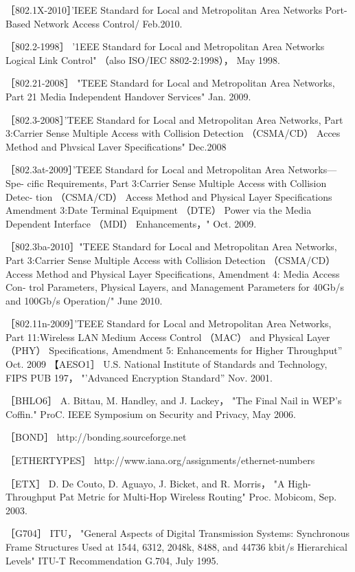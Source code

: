 ［802.1X-2010］'IEEE Standard for Local and Metropolitan Area Networks Port-
Based Network Access Control/ Feb.2010.

［802.2-1998］ '1EEE Standard for Local and Metropolitan Area Networks Logical
Link Control" （also ISO/IEC 8802-2:1998）， May 1998.

［802.21-2008］ "TEEE Standard for Local and Metropolitan Area Networks, Part 21
Media Independent Handover Services" Jan. 2009.

［802.3-2008］'TEEE Standard for Local and Metropolitan Area Networks, Part
3:Carrier Sense Multiple Access with Collision Detection （CSMA/CD） Acces
Method and Phvsical Laver Specifications" Dec.2008

［802.3at-2009］'TEEE Standard for Local and Metropolitan Area Networks—Spe-
cific Requirements, Part 3:Carrier Sense Multiple Access with Collision Detec-
tion （CSMA/CD） Access Method and Physical Layer Specifications Amendment
3:Date Terminal Equipment （DTE） Power via the Media Dependent Interface
（MDI） Enhancements，" Oct. 2009.

［802.3ba-2010］"TEEE Standard for Local and Metropolitan Area Networks, Part
3:Carrier Sense Multiple Access with Collision Detection （CSMA/CD） Access
Method and Physical Layer Specifications, Amendment 4: Media Access Con-
trol Parameters, Physical Layers, and Management Parameters for 40Gb/s and
100Gb/s Operation/" June 2010.

［802.11n-2009］'TEEE Standard for Local and Metropolitan Area Networks, Part
11:Wireless LAN Medium Access Control （MAC） and Physical Layer （PHY）
Specifications, Amendment 5: Enhancements for Higher Throughput” Oct. 2009
【AESO1］ U.S. National Institute of Standards and Technology, FIPS PUB 197，
"'Advanced Encryption Standard” Nov. 2001.

［BHLO6］ A. Bittau, M. Handley, and J. Lackey， "The Final Nail in WEP's Coffin."
ProC. IEEE Symposium on Security and Privacy, May 2006.

［BOND］ http://bonding.sourceforge.net

［ETHERTYPES］ http://www.iana.org/assignments/ethernet-numbers

［ETX］ D. De Couto, D. Aguayo, J. Bicket, and R. Morris， "A High-Throughput Pat
Metric for Multi-Hop Wireless Routing" Proc. Mobicom, Sep. 2003.

［G704］ ITU， "General Aspects of Digital Transmission Systems: Synchronous
Frame Structures Used at 1544, 6312, 2048k, 8488, and 44736 kbit/s Hierarchical
Levels" ITU-T Recommendation G.704, July 1995.


